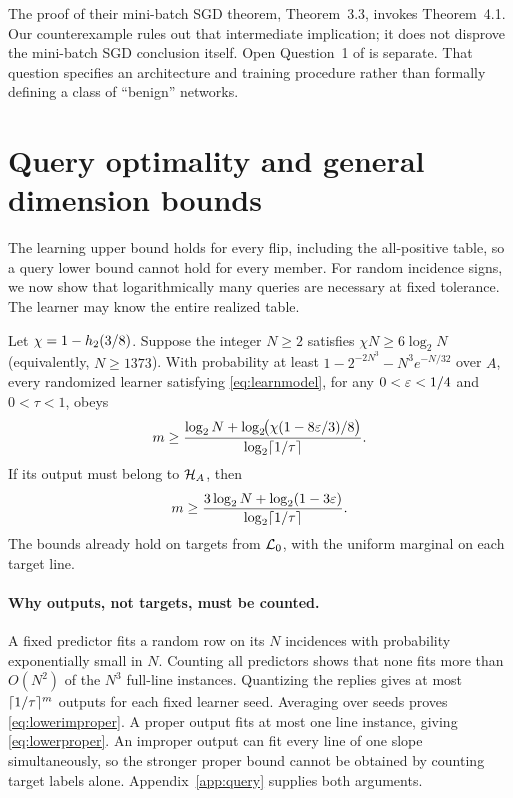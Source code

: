 The proof of their mini-batch SGD theorem, Theorem~3.3, invokes Theorem~4.1. Our counterexample rules out that intermediate implication; it does not disprove the mini-batch SGD conclusion itself. Open Question~1 of \citet{FKS26} is separate. That question specifies an architecture and training procedure rather than formally defining a class of ``benign'' networks.

\section{Query optimality and general dimension bounds}\label{sec:optimality}
The learning upper bound holds for every flip, including the all-positive table, so a query lower bound cannot hold for every member. For random incidence signs, we now show that logarithmically many queries are necessary at fixed tolerance. The learner may know the entire realized table.

\begin{theorem}\label{thm:querylower}
Let $\chi=1-h_2(3/8)$. Suppose the integer $N\ge2$ satisfies $\chi N\ge6\log_2N$ (equivalently, $N\ge1373$). With probability at least $1-2^{-2N^3}-N^3e^{-N/32}$ over $A$, every randomized learner satisfying \eqref{eq:learnmodel}, for any $0<\varepsilon<1/4$ and $0<\tau<1$, obeys
\begin{equation}
 m\ge\frac{\log_2 N+\log_2\!\bigl(\chi(1-8\varepsilon/3)/8\bigr)}{\log_2\lceil 1/\tau\rceil}.
 \label{eq:lowerimproper}
\end{equation}
If its output must belong to $\mathcal H_A$, then
\begin{equation}
 m\ge\frac{3\log_2 N+\log_2(1-3\varepsilon)}{\log_2\lceil 1/\tau\rceil}.
 \label{eq:lowerproper}
\end{equation}
The bounds already hold on targets from $\mathcal L_0$, with the uniform marginal on each target line.
\end{theorem}

\paragraph{Why outputs, not targets, must be counted.}
A fixed predictor fits a random row on its $N$ incidences with probability exponentially small in $N$. Counting all predictors shows that none fits more than $O(N^2)$ of the $N^3$ full-line instances. Quantizing the replies gives at most $\lceil 1/\tau\rceil^m$ outputs for each fixed learner seed. Averaging over seeds proves \eqref{eq:lowerimproper}. A proper output fits at most one line instance, giving \eqref{eq:lowerproper}. An improper output can fit every line of one slope simultaneously, so the stronger proper bound cannot be obtained by counting target labels alone. Appendix~\ref{app:query} supplies both arguments.

